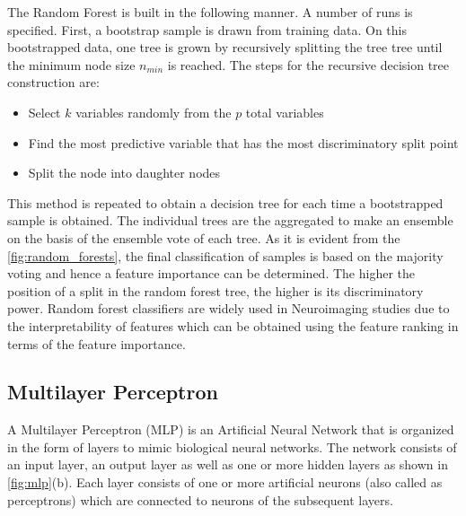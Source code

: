 \documentclass[msthesis.tex]{subfiles}
\begin{document}
The Random Forest is built in the following manner. A number of runs is specified. First, a bootstrap sample is drawn from training data. On this bootstrapped data, one tree is grown by recursively splitting the tree tree until the minimum node size $n_{min}$ is reached. The steps for the recursive decision tree construction are:
\begin{itemize}
    \item Select $k$ variables randomly from the $p$ total variables
    \item Find the most predictive variable that has the most discriminatory split point
    \item Split the node into daughter nodes

\end{itemize}
This method is repeated to obtain a decision tree for each time a bootstrapped sample is obtained. The individual trees are the aggregated to make an ensemble on the basis of the ensemble vote of each tree. As it is evident from the \autoref{fig:random_forests}, the final classification of samples is based on the majority voting and hence a feature importance can be determined. The higher the position of a split in the random forest tree, the higher is its discriminatory power. Random forest classifiers are widely used in Neuroimaging studies due to the interpretability of features which can be obtained using the feature ranking in terms of the feature importance. 



\subsection{Multilayer Perceptron}
A Multilayer Perceptron (MLP) is an Artificial Neural Network that is organized in the form of layers to mimic biological neural networks. The network consists of an input layer, an output layer as well as one or more hidden layers as shown in \autoref{fig:mlp}(b). Each layer consists of one or more artificial neurons (also called as perceptrons) which are connected to neurons of the subsequent layers. 
\end{document}
